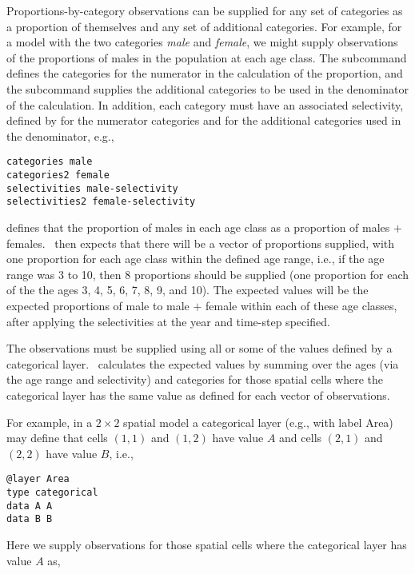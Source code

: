 {{{{{{Proportions-by-category observations can be supplied for any set of categories as a proportion of themselves and any set of additional categories. For example, for a model with the two categories \emph{male} and \emph{female}, we might supply observations of the proportions of males in the population at each age class. The subcommand  defines the categories for the numerator in the calculation of the proportion, and the subcommand  supplies the additional categories to be used in the denominator of the calculation. In addition, each category must have an associated selectivity, defined by  for the numerator categories and  for the additional categories used in the denominator, e.g., 

{\small{\begin{verbatim}
categories male
categories2 female
selectivities male-selectivity
selectivities2 female-selectivity
\end{verbatim}}}

defines that the proportion of males in each age class as a proportion of males $+$ females. \iSAM\ then expects that there will be a vector of proportions supplied, with one proportion for each age class within the defined age range, i.e., if the age range was 3 to 10, then 8 proportions should be supplied (one proportion for each of the the ages 3, 4, 5, 6, 7, 8, 9, and 10). The expected values will be the expected proportions of male to male $+$ female within each of these age classes, after applying the selectivities at the year and time-step specified. 

The observations must be supplied using all or some of the values defined by a categorical layer. \iSAM\ calculates the expected values by summing over the ages (via the age range and selectivity) and categories for those spatial cells where the categorical layer has the same value as defined for each vector of observations.

For example, in a $2 \times 2$ spatial model a categorical layer (e.g., with label Area) may define that cells $(1,1)$ and $(1,2)$ have value $A$ and cells $(2,1)$ and $(2,2)$ have value $B$, i.e.,

{\small{\begin{verbatim}
@layer Area
type categorical
data A A 
data B B
\end{verbatim}}}

Here we supply observations for those spatial cells where the categorical layer has value $A$ as, 

}}}}}}
